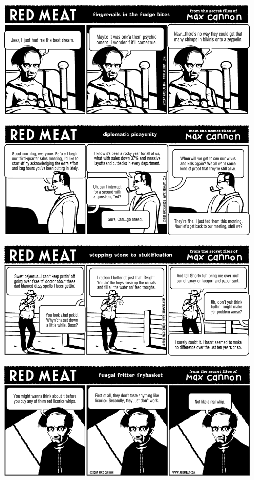 \documentclass[a4paper,twoside,11pt]{article}
\begin{document}
\includegraphics[width=\textwidth]{redmeat_2007-04-10.png}



\includegraphics[width=\textwidth]{redmeat_2007-04-17.png}



\includegraphics[width=\textwidth]{redmeat_2007-04-24.png}



\includegraphics[width=\textwidth]{redmeat_2007-05-01.png}
\end{document}
